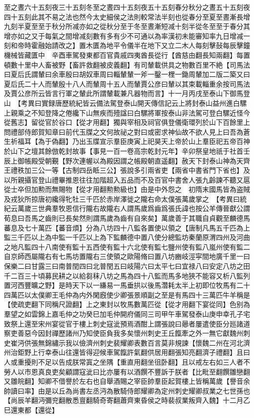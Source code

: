 至之晝六十五刻夜三十五刻冬至之晝四十五刻夜五十五刻春分秋分之晝五十五刻夜四十五刻此其不易之法也然今太史細侯之法則較常法半刻也從春分至夏至晝漸長增九刻半夏至至于秋分所减亦如之從秋分至于冬至晝漸短减十刻半從冬至至于春分其增亦如之又于每氣之間增减刻數有多有少不可通以為率漢初未能審知率九日增减一刻和帝時霍融始請改之】置木匱為地平令儀半在地下又立二木人每刻擊鼔每辰擊鐘機械皆藏匱中　辛酉車駕發東都百官貴戚四夷酋長從行【酋慈由翻長知兩翻】每置頓數十里中人畜被野【畜許救翻被皮義翻】有司輦載供具之物數百里不絶【司馬法曰夏后氏謂輦曰余車殷曰胡奴車周曰輜輦輦一斧一鑿一梩一鋤周輦加二版二築又曰夏后氏二十人而輦殷十八人而輦周十五人而輦賈公彦曰輦以其束載輜重余按司馬法及賈公彦所云皆言行軍之輦此所謂輦載兼凡器物而言】十一月丙戌至泰山下御馬登山　【考異曰實録唐歷統紀皆云備法駕登泰山開天傳信記云上將封泰山益州進白騾上親乘之不知登降之倦纔下山無疾而殪諡曰白騾將軍按泰山非法駕可登白騾近怪今從舊志】留從官於谷口【從才用翻】獨與宰相及祠官俱登儀衛環列於山下百餘里上問禮部侍郎賀知章曰前代玉牒之文何故祕之對曰或密求神仙故不欲人見上曰吾為蒼生祈福耳【為于偽翻】乃出玉牒宣示羣臣庚寅上祀昊天上帝於山上羣臣祀五帝百神於山下之壇其餘倣乾封故事【事見一百一卷高宗乾封元年】辛卯祭皇地祇于社首壬辰上御帳殿受朝覲【野次連幄以為殿因謂之帳殿朝直遥翻】赦天下封泰山神為天齊王禮秩加三公一等【古制四岳眡三公】張說多引兩省吏【兩省中書省門下省也】及以所親攝官登山禮畢推恩往往加階超入五品而不及百官中書舍人張九齡諫不聽又扈從士卒但加勲而無賜物【從才用翻勲勲級也】由是中外怨之　初隋末國馬皆為盗賊及戎狄所掠唐初纔得牝牡三千匹於赤岸澤徙之隴右命太僕張萬歲掌之　【考異曰統紀云萬歲三世典羣牧恩信行隴右故隴右人謂馬歲爲齒爲張氏諱也按公羊傳晉獻公謂荀息曰吾馬之齒則已長矣然則謂馬歲為齒有自來矣】萬歲善于其職自貞觀至麟德馬蕃息及七十萬匹【蕃音煩】分為八坊四十八監各置使以領之【唐制凡馬五千匹為上監三千匹以上為中監一千匹以上為下監麟德中置八使分總監坊秦蘭原渭四州及河曲之地凡監四十八南使有監十五西使有監十六北使有監七鹽州使有監八嵐州使有監二自京師西屬隴右有七馬坊置隴右三使領之歐陽脩曰置八坊豳岐涇寜間地廣千里一曰保樂二曰甘露三曰南普閏四曰北普閏五曰岐陽六曰太平七曰宜禄八曰安定八坊之田千二百三十頃募民耕之以給芻秣八坊之馬為四十八監而馬多地狹不能容又析八監列置河西豐曠之野】是時天下以一縑易一馬垂拱以後馬濳耗太半上初即位牧馬有二十四萬匹以太僕卿王毛仲為内外閑廐使少卿張景順副之至是有馬四十三萬匹牛羊稱是【使疏吏翻下同稱尺證翻】上之東封以牧馬數萬匹從【從才用翻下宴從同】色别為羣望之如雲錦上嘉毛仲之功癸巳加毛仲開府儀同三司甲午車駕發泰山庚申幸孔子宅致祭上還至宋州宴從官于樓上刺史寇泚預焉酒酣上謂張說曰曏者屢遣使臣分廵諸道察吏善惡今因封禪歷諸州乃知使臣負我多矣懷州刺史王丘餼牽之外一無它獻魏州刺史崔沔供張無錦繡示我以儉濟州刺史裴耀卿表數百言莫非規諫【懷魏二州在河北濟州治鉅野上行幸泰山往還皆得迎候車駕餼許氣翻供居用翻張知亮翻濟子禮翻】且曰人或重擾則不足以告成朕常寘之坐隅【重直用翻坐徂卧翻】且以戒左右如三人者不勞人以市恩真良吏矣顧謂寇泚曰比亦屢有以酒饌不豐訴于朕者【比毗至翻饌雛戀翻又雛皖翻】知卿不借譽於左右也自舉酒賜之宰臣帥羣臣起賀樓上皆稱萬歲【譽音余帥讀曰率】由是以丘為尚書左丞沔為散騎侍郎耀卿為定州刺史耀卿叔業之七世孫也【尚辰羊翻沔彌兖翻散悉亶翻騎奇寄翻蕭齊東昏侯之時裴叔業叛齊入魏】十二月乙巳還東都【還從】

